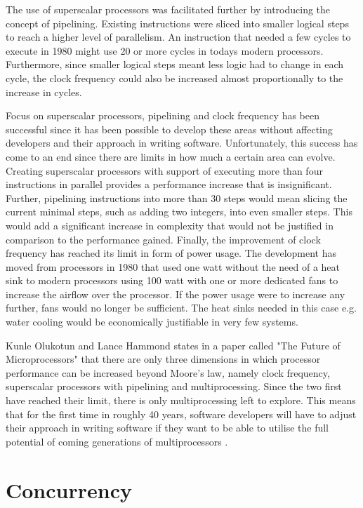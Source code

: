 \documentclass[conference]{IEEEtran}
\begin{document}
The use of superscalar processors was facilitated further by introducing the concept of pipelining. Existing instructions were sliced into smaller logical steps to reach a higher level of parallelism. An instruction that needed a few cycles to execute in 1980 might use 20 or more cycles in todays modern processors. Furthermore, since smaller logical steps meant less logic had to change in each cycle, the clock frequency could also be increased almost proportionally to the increase in cycles.

Focus on superscalar processors, pipelining and clock frequency has been successful since it has been possible to develop these areas without affecting developers and their approach in writing software. Unfortunately, this success has come to an end since there are limits in how much a certain area can evolve. Creating superscalar processors with support of executing more than four instructions in parallel provides a performance increase that is insignificant. Further, pipelining instructions into more than 30 steps would mean slicing the current minimal steps, such as adding two integers, into even smaller steps. This would add a significant increase in complexity that would not be justified in comparison to the performance gained. Finally, the improvement of clock frequency has reached its limit in form of power usage. The development has moved from processors in 1980 that used one watt without the need of a heat sink to modern processors using 100 watt with one or more dedicated fans to increase the airflow over the processor. If the power usage were to increase any further, fans would no longer be sufficient. The heat sinks needed in this case e.g. water cooling would be economically justifiable in very few systems.

Kunle Olukotun and Lance Hammond states in a paper called "The Future of Microprocessors" that there are only three dimensions in which processor performance can be increased beyond Moore's law, namely clock frequency, superscalar processors with pipelining and multiprocessing. Since the two first have reached their limit, there is only multiprocessing left to explore. This means that for the first time in roughly 40 years, software developers will have to adjust their approach in writing software if they want to be able to utilise the full potential of coming generations of multiprocessors \cite{proc}.

\section{Concurrency}
\end{document}
